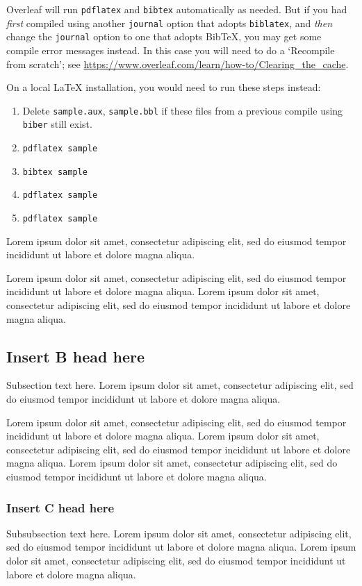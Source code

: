 \documentclass[
  journal=medium,
  manuscript=Qualcomm-Innovation-Fellowship-Proposal,
  year=22-February-2023,
]{cup-journal}
\begin{document}
Overleaf will run \texttt{pdflatex} and \texttt{bibtex} automatically as needed. But if you had \emph{first} compiled using another \texttt{journal} option that adopts \texttt{biblatex}, and \emph{then} change the \texttt{journal} option to one that adopts Bib\TeX{}, you may get some compile error messages instead. In this case you will need to do a `Recompile from scratch'; see \url{https://www.overleaf.com/learn/how-to/Clearing_the_cache}.

On a local \LaTeX{} installation, you would need to run these steps instead:
\begin{enumerate}
    \item Delete \texttt{sample.aux}, \texttt{sample.bbl} if these files from a previous compile using \texttt{biber} still exist.
    \item \verb|pdflatex sample|
    \item \verb|bibtex sample|
    \item \verb|pdflatex sample|
    \item \verb|pdflatex sample|
\end{enumerate}

Lorem ipsum dolor sit amet, consectetur adipiscing elit, sed do eiusmod tempor incididunt ut labore et dolore magna aliqua. 

Lorem ipsum dolor sit amet, consectetur adipiscing elit, sed do eiusmod tempor incididunt ut labore et dolore magna aliqua. Lorem ipsum dolor sit amet, consectetur adipiscing elit, sed do eiusmod tempor incididunt ut labore et dolore magna aliqua. 


\subsection{Insert B head here}
Subsection text here. Lorem ipsum\autocite{Bayer_etal_2013} dolor sit amet, consectetur adipiscing elit, sed do eiusmod tempor incididunt ut labore\autocite{Adade_etal_2007} et dolore magna aliqua. 

 Lorem ipsum dolor sit amet, consectetur adipiscing elit, sed do eiusmod tempor incididunt ut labore et dolore magna aliqua. Lorem ipsum dolor sit amet, consectetur adipiscing elit, sed do eiusmod tempor incididunt ut labore et dolore magna aliqua. Lorem ipsum dolor sit amet, consectetur adipiscing elit, sed do eiusmod tempor incididunt ut labore et dolore magna aliqua. 

\subsubsection{Insert C head here}
Subsubsection text here. Lorem ipsum dolor sit amet, consectetur adipiscing elit, sed do eiusmod tempor incididunt ut labore et dolore magna aliqua. 
Lorem ipsum dolor sit amet, consectetur adipiscing elit, sed do eiusmod tempor incididunt ut labore et dolore magna aliqua. 
\end{document}
